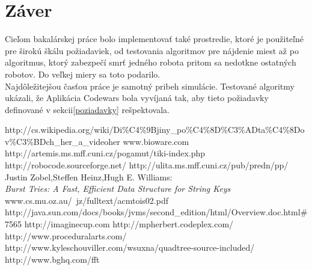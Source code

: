 \documentclass[12pt,a4paper,notitlepage]{report}
\begin{document}
\chapter{Záver}
Cieľom bakalárskej práce bolo implementovať také prostredie, ktoré je použiteľné pre širokú škálu požiadaviek, od testovania algoritmov pre nájdenie miest až po algoritmus, ktorý zabezpečí smrť jedného robota pritom sa nedotkne ostatných robotov. Do veľkej miery sa toto podarilo. \\
Najdôležitejšou časťou práce je samotný pribeh simulácie.
 Testované algoritmy ukázali, že 
Aplikácia Codewars bola vyvíjaná tak, aby tieto požiadavky definované v sekcii\ref{poziadavky} rešpektovala.

\newpage
{}
\begin{thebibliography}{99}
http://cs.wikipedia.org/wiki/Di\%C4\%9Bjiny\_po\%C4\%8D\%C3\%ADta\%C4\%8Dov\%C3\%BDch\_her\_a\_videoher
www.bioware.com
http://artemis.ms.mff.cuni.cz/pogamut/tiki-index.php
 http://robocode.sourceforge.net/
 http://ulita.ms.mff.cuni.cz/pub/predn/pp/
Justin Zobel,Steffen Heinz,Hugh E. Williams:\\
{\it Burst Tries: A Fast, Efficient Data Structure for String Keys} www.cs.mu.oz.au/~jz/fulltext/acmtois02.pdf
http://java.sun.com/docs/books/jvms/second\_edition/html/Overview.doc.html\#7565
http://imaginecup.com
http://mpherbert.codeplex.com/
http://www.proceduralarts.com/
http://www.kyleschouviller.com/wsuxna/quadtree-source-included/
http://www.bghq.com/fft 
\end{thebibliography}
\end{document}
